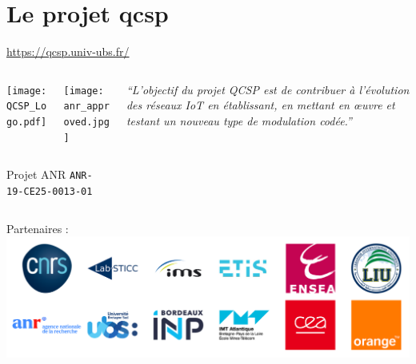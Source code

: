 \documentclass[../main.tex]{subfiles}
\begin{document}
\section[\acrshort{qcsp}]{Le projet \acrfull{qcsp}}

\begin{frame}{\secname}{\href{https://qcsp.univ-ubs.fr/}{https://qcsp.univ-ubs.fr/}}

  \begin{columns}
    \begin{column}{.4\linewidth} \centering
      \begin{columns}
        \begin{column}{.4\linewidth}
          \texttt{[image: QCSP\_Logo.pdf]}
        \end{column}
        \begin{column}{.2\linewidth}
          \texttt{[image: anr\_approved.jpg]}
        \end{column}
      \end{columns}
      \small \vspace{5pt} Projet ANR \texttt{ANR-19-CE25-0013-01}
    \end{column}
    \begin{column}{.5\linewidth}
      \emph{``L'objectif du projet QCSP est de contribuer à l'évolution des réseaux IoT en établissant,
        en mettant en œuvre et testant un nouveau type de modulation codée.''}
    \end{column}
  \end{columns}

  \vspace{2 em}

  \begin{center}
    Partenaires :\\
    \includegraphics[width=0.6\linewidth]{figures/logos-thesis/partners-logos.png}
  \end{center}
\end{frame}
\end{document}
